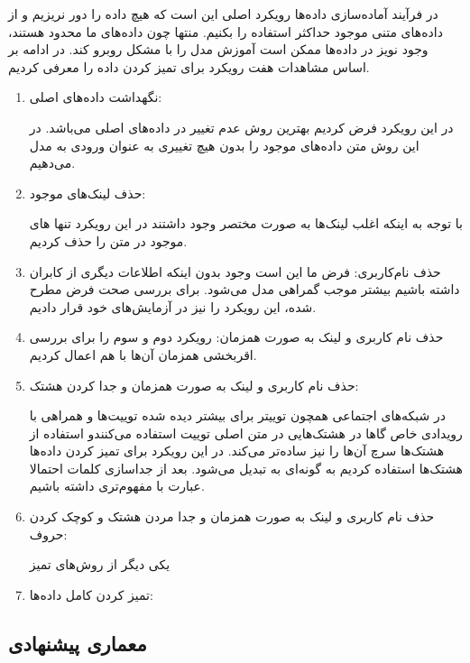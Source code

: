 در فرآیند آماده‌سازی داده‌ها رویکرد اصلی این است که هیچ داده‌ را دور نریزیم و از داده‌های متنی موجود حداکثر استفاده را بکنیم. منتها چون داده‌های ما محدود هستند، وجود نویز در داده‌ها ممکن است آموزش مدل را با مشکل روبرو کند. در ادامه بر اساس مشاهدات هفت رویکرد برای تمیز کردن داده را معرفی کردیم.
\begin{enumerate}
	\item نگهداشت داده‌های اصلی:

در این رویکرد فرض کردیم بهترین روش عدم تغییر در داده‌های اصلی می‌باشد. در این روش متن داده‌های موجود را بدون هیچ تغییری به عنوان ورودی به مدل می‌دهیم.
	\item حذف لینک‌های موجود:
	
	با توجه به اینکه اغلب لینک‌ها به صورت مختصر وجود داشتند در این رویکرد تنها
	های موجود در متن را حذف کردیم.
	\item حذف نام‌کاربری:
فرض ما این است وجود 
بدون اینکه اطلاعات دیگری از کابران داشته باشیم بیشتر موجب گمراهی مدل می‌شود. برای بررسی صحت فرض مطرح شده، این رویکرد را نیز در آزمایش‌های خود قرار دادیم.
	\item حذف نام کاربری و لینک به صورت همزمان:
رویکرد دوم و سوم را برای بررسی اقربخشی همزمان آن‌ها با هم اعمال کردیم.

	\item حذف نام کاربری و لینک به صورت همزمان و جدا کردن هشتک:
	
در شبکه‌های اجتماعی همچون توییتر برای بیشتر دیده شده توییت‌ها و همراهی با رویدادی خاص گاها در هشتک‌هایی در متن اصلی توییت استفاده می‌کنندو استفاده از  هشتک‌ها سرچ آن‌ها را نیز ساده‌تر می‌کند. در این رویکرد برای تمیز کردن داده‌ها هشتک‌ها استفاده کردیم به گونه‌ای 
به
 تبدیل می‌شود. بعد از جداسازی کلمات احتمالا عبارت با مفهوم‌تری داشته باشیم.
 
	\item حذف نام کاربری و لینک به صورت همزمان و جدا مردن هشتک و کوچک کردن حروف:
	
	یکی دیگر از روش‌های تمیز 
	\item تمیز کردن کامل داده‌ها:
\end{enumerate}

\subsection{معماری پیشنهادی}

